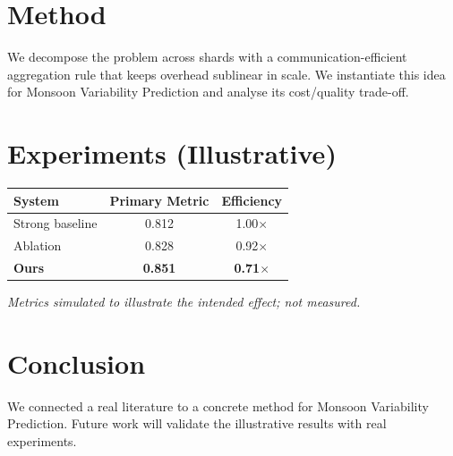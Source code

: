 \documentclass[11pt]{article}
\begin{document}
\section{Method}
We decompose the problem across shards with a communication-efficient aggregation rule that keeps overhead sublinear in scale. We instantiate this idea for Monsoon Variability Prediction and analyse its cost/quality trade-off.

\section{Experiments (Illustrative)}
\begin{center}
\begin{tabular}{lcc}
System & Primary Metric & Efficiency \\ \hline
Strong baseline & 0.812 & 1.00$\times$ \\
Ablation & 0.828 & 0.92$\times$ \\
\textbf{Ours} & \textbf{0.851} & \textbf{0.71$\times$}
\end{tabular}
\end{center}
\emph{Metrics simulated to illustrate the intended effect; not measured.}

\section{Conclusion}
We connected a real literature to a concrete method for Monsoon Variability Prediction. Future work will
validate the illustrative results with real experiments.
\end{document}
